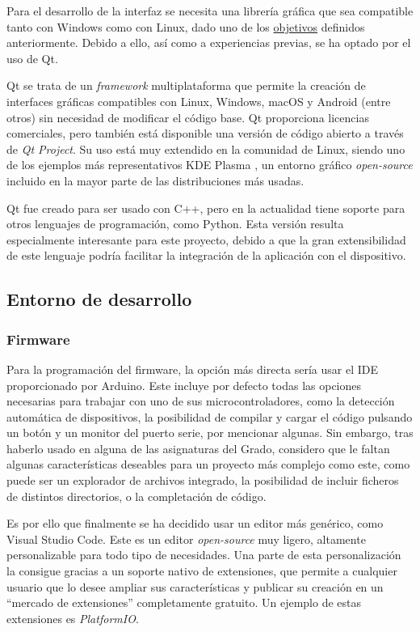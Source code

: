 Para el desarrollo de la interfaz se necesita una librería gráfica que sea compatible tanto con Windows como con Linux, dado uno de los \hyperref[sec:objetivos]{objetivos} definidos anteriormente. Debido a ello, así como a experiencias previas, se ha optado por el uso de Qt.

Qt se trata de un \textit{framework} multiplataforma que permite la creación de interfaces gráficas compatibles con Linux, Windows, macOS y Android (entre otros) sin necesidad de modificar el código base. Qt proporciona licencias comerciales, pero también está disponible una versión de código abierto a través de \textit{Qt Project}. Su uso está muy extendido en la comunidad de Linux, siendo uno de los ejemplos más representativos KDE Plasma \cite{kde-plasma}, un entorno gráfico \textit{open-source} incluido en la mayor parte de las distribuciones más usadas.

Qt fue creado para ser usado con C++, pero en la actualidad tiene soporte para otros lenguajes de programación, como Python. Esta versión resulta especialmente interesante para este proyecto, debido a que la gran extensibilidad de este lenguaje podría facilitar la integración de la aplicación con el dispositivo.

\subsection{Entorno de desarrollo}

\subsubsection{Firmware}

Para la programación del firmware, la opción más directa sería usar el IDE proporcionado por Arduino. Este incluye por defecto todas las opciones necesarias para trabajar con uno de sus microcontroladores, como la detección automática de dispositivos, la posibilidad de compilar y cargar el código pulsando un botón y un monitor del puerto serie, por mencionar algunas. Sin embargo, tras haberlo usado en alguna de las asignaturas del Grado, considero que le faltan algunas características deseables para un proyecto más complejo como este, como puede ser un explorador de archivos integrado, la posibilidad de incluir ficheros de distintos directorios, o la completación de código.

Es por ello que finalmente se ha decidido usar un editor más genérico, como Visual Studio Code. Este es un editor \textit{open-source} muy ligero, altamente personalizable para todo tipo de necesidades. Una parte de esta personalización la consigue gracias a un soporte nativo de extensiones, que permite a cualquier usuario que lo desee ampliar sus características y publicar su creación en un ``mercado de extensiones'' completamente gratuito. Un ejemplo de estas extensiones es \textit{PlatformIO}.

